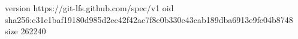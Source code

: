 version https://git-lfs.github.com/spec/v1
oid sha256:c31e1baf19180d985d2ec42f42ac7f8e0b330e43cab189dba6913e9fe04b8748
size 262240
